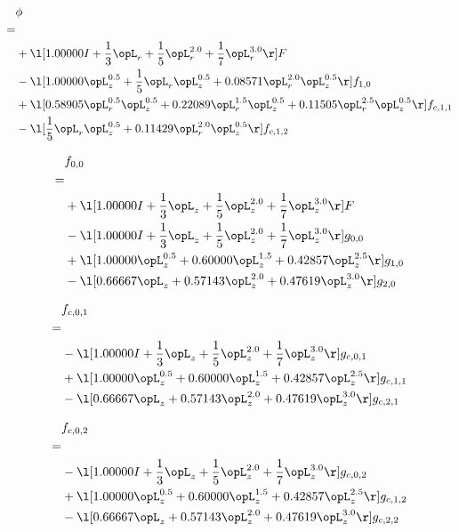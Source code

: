 \begin{alignat}{2} 
\label{eq:scalarFlux_0} 
& \phi \nonumber \\ 
 = \\ 
& + \l[  1.00000 I + \frac{1}{3} \opL_r + \frac{1}{5} \opL_r^{2.0} + \frac{1}{7} \opL_r^{3.0}  \r] F \nonumber \\ 
& - \l[  1.00000 \opL_z^{0.5} + \frac{1}{5} \opL_r \opL_z^{0.5} +  0.08571 \opL_r^{2.0} \opL_z^{0.5}  \r] f_{1,0} \nonumber \\ 
& + \l[  0.58905 \opL_r^{0.5} \opL_z^{0.5} +  0.22089 \opL_r^{1.5} \opL_z^{0.5} +  0.11505 \opL_r^{2.5} \opL_z^{0.5}  \r] f_{c,1,1} \nonumber \\ 
& - \l[ \frac{1}{5} \opL_r \opL_z^{0.5} +  0.11429 \opL_r^{2.0} \opL_z^{0.5}  \r] f_{c,1,2} \nonumber \\ 
\end{alignat} 


\begin{alignat}{2} 
\label{eq:f_00_0} 
& f_{0,0} \nonumber \\ 
 = \\ 
& + \l[  1.00000 I + \frac{1}{3} \opL_z + \frac{1}{5} \opL_z^{2.0} + \frac{1}{7} \opL_z^{3.0}  \r] F \nonumber \\ 
& - \l[  1.00000 I + \frac{1}{3} \opL_z + \frac{1}{5} \opL_z^{2.0} + \frac{1}{7} \opL_z^{3.0}  \r] g_{0,0} \nonumber \\ 
& + \l[  1.00000 \opL_z^{0.5} +  0.60000 \opL_z^{1.5} +  0.42857 \opL_z^{2.5}  \r] g_{1,0} \nonumber \\ 
& - \l[  0.66667 \opL_z +  0.57143 \opL_z^{2.0} +  0.47619 \opL_z^{3.0}  \r] g_{2,0} \nonumber \\ 
\end{alignat} 


\begin{alignat}{2} 
\label{eq:f_01_0} 
& f_{c,0,1} \nonumber \\ 
 = \\ 
& - \l[  1.00000 I + \frac{1}{3} \opL_z + \frac{1}{5} \opL_z^{2.0} + \frac{1}{7} \opL_z^{3.0}  \r] g_{c,0,1} \nonumber \\ 
& + \l[  1.00000 \opL_z^{0.5} +  0.60000 \opL_z^{1.5} +  0.42857 \opL_z^{2.5}  \r] g_{c,1,1} \nonumber \\ 
& - \l[  0.66667 \opL_z +  0.57143 \opL_z^{2.0} +  0.47619 \opL_z^{3.0}  \r] g_{c,2,1} \nonumber \\ 
\end{alignat} 


\begin{alignat}{2} 
\label{eq:f_02_0} 
& f_{c,0,2} \nonumber \\ 
 = \\ 
& - \l[  1.00000 I + \frac{1}{3} \opL_z + \frac{1}{5} \opL_z^{2.0} + \frac{1}{7} \opL_z^{3.0}  \r] g_{c,0,2} \nonumber \\ 
& + \l[  1.00000 \opL_z^{0.5} +  0.60000 \opL_z^{1.5} +  0.42857 \opL_z^{2.5}  \r] g_{c,1,2} \nonumber \\ 
& - \l[  0.66667 \opL_z +  0.57143 \opL_z^{2.0} +  0.47619 \opL_z^{3.0}  \r] g_{c,2,2} \nonumber \\ 
\end{alignat} 



